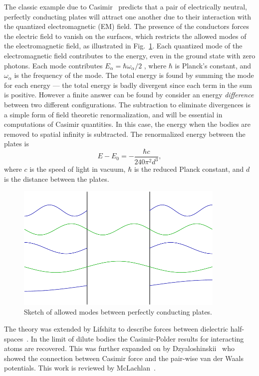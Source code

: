 \begin{enumerate}
The classic example due to Casimir~\cite{Casimir1948} predicts that a pair of electrically neutral,
perfectly conducting plates will attract one another due to their interaction with the quantized 
electromagnetic (EM) field.  
The presence of the conductors forces the electric field to vanish on the surfaces,
which restricts the allowed modes of the electromagnetic field, as illustrated in Fig.~\ref{fig:Casimir_sketch}.
Each quantized mode of the electromagnetic field contributes
to the energy, even in the ground state with zero photons.  Each mode contributes 
$E_\alpha=\hbar\omega_\alpha/2$ , where $\hbar$ is Planck's  constant, and $\omega_\alpha$ is the frequency of the mode.
The total energy is found by summing the mode for each energy --- the total energy is
badly divergent since each term in the sum is positive.  However a finite answer can 
be found by consider an energy \emph{difference} between two different configurations.  
The subtraction to eliminate divergences is a simple form of field theoretic renormalization, 
and will be essential in computations of Casimir quantities.  
In this case, the energy when the bodies are removed to spatial infinity is subtracted.  
The renormalized energy between the plates is
\begin{equation}
  E-E_0 = -\frac{\hbar c}{240\pi^2 d^3},
\end{equation}
where $c$ is the speed of light in vacuum, $\hbar$ is the reduced Planck constant,
and $d$ is the distance between the plates.  

\begin{figure}
\center
\includegraphics[width=10cm]{fig/intro/twoplanes_wave}
\caption{Sketch of allowed modes between perfectly conducting plates.}
\label{fig:Casimir_sketch}
\end{figure}

The theory was extended by Lifshitz to describe forces between dielectric half-spaces~\cite{Lifshitz1956}.
In the limit of dilute bodies the Casimir-Polder results for interacting atoms are recovered.  
This was further expanded on by Dzyaloshinskii~\etal\cite{Dzyaloshinskii1959,Dzyaloshinskii1961} who
showed the connection between Casimir force and the pair-wise van der Waals potentials.  
This work is reviewed by McLachlan~\cite{McLachlan1963, McLachlan1963a}.  



\end{enumerate}
